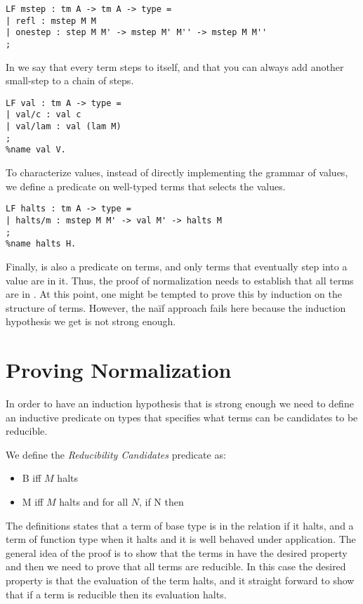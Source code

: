 \begin{lstlisting}
LF mstep : tm A -> tm A -> type =
| refl : mstep M M
| onestep : step M M' -> mstep M' M'' -> mstep M M''
;
\end{lstlisting}

In  we say that every term steps to itself, and that you can
always add another small-step to a chain of steps.

\begin{lstlisting}
LF val : tm A -> type =
| val/c : val c
| val/lam : val (lam M)
;
%name val V.
\end{lstlisting}

To characterize values, instead of directly implementing the grammar
of values, we define a predicate on well-typed terms that selects the
values.

\begin{lstlisting}
LF halts : tm A -> type =
| halts/m : mstep M M' -> val M' -> halts M
;
%name halts H.
\end{lstlisting}

Finally,  is also a predicate on terms, and only terms that
eventually step into a value are in it. Thus, the proof of
normalization needs to establish that all terms are in . At
this point, one might be tempted to prove this by induction on the
structure of terms. However, the na\"if approach fails here because
the induction hypothesis we get is not strong
enough. 

\section{Proving Normalization}

In order to have an induction hypothesis that is strong enough we need
to define an inductive predicate on types that specifies what terms
can be candidates to be reducible.

We define the \emph{Reducibility Candidates} predicate as:

\begin{itemize}
\item \rc \iota B iff $M$ halts
\item {} M iff $M$ halts and for all $N$, if  N then 
\end{itemize}

The definitions states that a term of base type is in the relation if
it halts, and a term of function type when it halts and it is well
behaved under application. The general idea of the proof is to show
that the terms in  have the desired property and then we need
to prove that all terms are reducible. In this case the desired
property is that the evaluation of the term halts, and it straight
forward to show that if a term is reducible then its evaluation halts.

